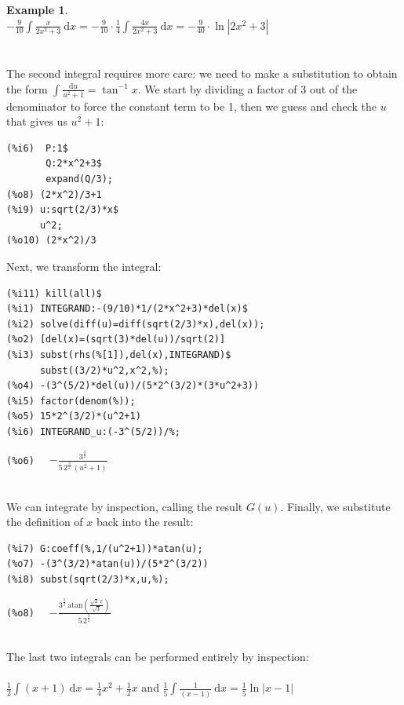 \documentclass[10.5pt,twoside]{report}
\theoremstyle{definition}
\newtheorem{exmp}{Example}[section]
\begin{document}
\begin{exmp}
${}$\\ 

$-\frac{9}{10}\displaystyle \int \frac{x}{2x^2+3}\ \mathrm{d}x=-\frac{9}{10}\cdot \frac{1}{4} \displaystyle \int \frac{4x}{2x^2+3}\ \mathrm{d}x=-\frac{9}{40}\cdot \ln{|2x^2+3|}$\\
${}$\\
${}$\\
The second integral requires more care:  we need to make a substitution to obtain the form $\displaystyle \int \frac{\mathrm{d}u}{u^2+1}=\tan^{-1}{x}$.  We start by dividing a factor of 3 out of the denominator to force the constant term to be 1, then we guess and check the $u$ that gives us $u^2+1$:

\begin{verbatim}
(%i6)  P:1$
       Q:2*x^2+3$
       expand(Q/3);
(%o8) (2*x^2)/3+1
(%i9) u:sqrt(2/3)*x$
      u^2;
(%o10) (2*x^2)/3
\end{verbatim}

Next, we transform the integral:

\begin{verbatim}
(%i11) kill(all)$
(%i1) INTEGRAND:-(9/10)*1/(2*x^2+3)*del(x)$
(%i2) solve(diff(u)=diff(sqrt(2/3)*x),del(x));
(%o2) [del(x)=(sqrt(3)*del(u))/sqrt(2)]
(%i3) subst(rhs(%[1]),del(x),INTEGRAND)$
      subst((3/2)*u^2,x^2,%);
(%o4) -(3^(5/2)*del(u))/(5*2^(3/2)*(3*u^2+3))
(%i5) factor(denom(%));
(%o5) 15*2^(3/2)*(u^2+1)
(%i6) INTEGRAND_u:(-3^(5/2))/%;
\end{verbatim}
\verb|(%o6)  | $-\frac{{3}^{\frac{3}{2}}}{5\,{2}^{\frac{3}{2}}\,\left( {u}^{2}+1\right) }$

${}$\\
We can integrate by inspection, calling the result $G(u)$.  Finally, we substitute the definition of $x$ back into the result:

\begin{verbatim}
(%i7) G:coeff(%,1/(u^2+1))*atan(u);
(%o7) -(3^(3/2)*atan(u))/(5*2^(3/2))
(%i8) subst(sqrt(2/3)*x,u,%);
\end{verbatim}

\verb|(%o8)  | $-\frac{{3}^{\frac{3}{2}}\,\mathrm{atan}\left( \frac{\sqrt{2}\,x}{\sqrt{3}}\right) }{5\,{2}^{\frac{3}{2}}}$

${}$\\

The last two integrals can be performed entirely by inspection:  \\
${}$\\
$\frac{1}{2}\displaystyle \int (x+1)\ \mathrm{d}x=\frac{1}{4}x^2 + \frac{1}{2}x$
and
$\frac{1}{5}\displaystyle \int \frac{1}{(x-1)}\ \mathrm{d}x = \frac{1}{5}\ln{|x-1|}$\\


\end{exmp}
\end{document}
